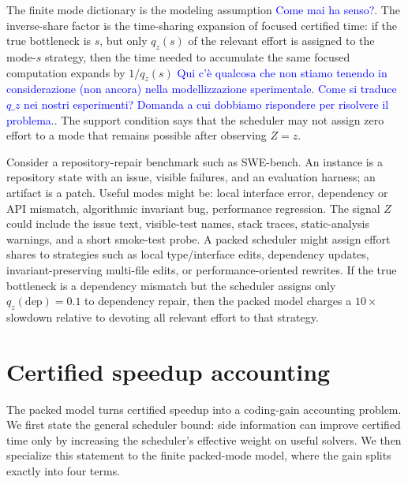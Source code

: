 \documentclass{article}
\newcounter{algorithm}
\begin{document}
The finite mode dictionary is the modeling assumption \textcolor{blue}{Come mai ha senso?}.  The inverse-share factor is the
time-sharing expansion of focused certified time: if the true bottleneck is \(s\), but only
\(q_z(s)\) of the relevant effort is assigned to the mode-\(s\) strategy, then the time needed
to accumulate the same focused computation expands by \(1/q_z(s)\) \textcolor{blue}{Qui c'è qualcosa che non stiamo tenendo in considerazione (non ancora) nella modellizzazione sperimentale. Come si traduce $q\_z$ nei nostri esperimenti? Domanda a cui dobbiamo rispondere per risolvere il problema.}.
The support condition says that the scheduler may not assign zero effort to a mode that
remains possible after observing \(Z=z\).

Consider a repository-repair benchmark such as SWE-bench.  An instance is a repository
state with an issue, visible failures, and an evaluation harness; an artifact is a patch.
Useful modes might be: local interface error, dependency or API mismatch, algorithmic invariant bug, performance regression.
The signal \(Z\) could include the issue text, visible-test names, stack traces, static-analysis
warnings, and a short smoke-test probe.  A packed scheduler might assign effort shares to
strategies such as local type/interface edits, dependency updates, invariant-preserving
multi-file edits, or performance-oriented rewrites.  If the true bottleneck is a dependency
mismatch but the scheduler assigns only \(q_z(\mathrm{dep})=0.1\) to dependency repair,
then the packed model charges a \(10\times\) slowdown relative to devoting all relevant
effort to that strategy.

\section{Certified speedup accounting}
\label{sec:accounting}

The packed model turns certified speedup into a coding-gain accounting problem.
We first state the general scheduler bound: side information can improve certified time
only by increasing the scheduler's effective weight on useful solvers.  We then specialize
this statement to the finite packed-mode model, where the gain splits exactly into four terms.
\end{document}
